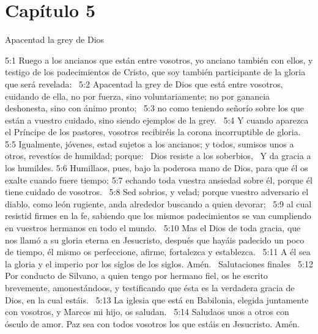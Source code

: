 \section*{Capítulo 5}
Apacentad la grey de Dios  

5:1 Ruego a los ancianos que están entre vosotros, yo anciano también con ellos, y testigo de los padecimientos de Cristo, que soy también participante de la gloria que será revelada:  
5:2 Apacentad la grey de Dios que está entre vosotros, cuidando de ella, no por fuerza, sino voluntariamente; no por ganancia deshonesta, sino con ánimo pronto;  
5:3 no como teniendo señorío sobre los que están a vuestro cuidado, sino siendo ejemplos de la grey.  
5:4 Y cuando aparezca el Príncipe de los pastores, vosotros recibiréis la corona incorruptible de gloria.  
5:5 Igualmente, jóvenes, estad sujetos a los ancianos; y todos, sumisos unos a otros, revestíos de humildad; porque:  
Dios resiste a los soberbios,  
Y da gracia a los humildes. 
5:6 Humillaos, pues, bajo la poderosa mano de Dios, para que él os exalte cuando fuere tiempo; 
5:7 echando toda vuestra ansiedad sobre él, porque él tiene cuidado de vosotros.  
5:8 Sed sobrios, y velad; porque vuestro adversario el diablo, como león rugiente, anda alrededor buscando a quien devorar;  
5:9 al cual resistid firmes en la fe, sabiendo que los mismos padecimientos se van cumpliendo en vuestros hermanos en todo el mundo.  
5:10 Mas el Dios de toda gracia, que nos llamó a su gloria eterna en Jesucristo, después que hayáis padecido un poco de tiempo, él mismo os perfeccione, afirme, fortalezca y establezca.  
5:11 A él sea la gloria y el imperio por los siglos de los siglos. Amén.  
Salutaciones finales  
5:12 Por conducto de Silvano, a quien tengo por hermano fiel, os he escrito brevemente, amonestándoos, y testificando que ésta es la verdadera gracia de Dios, en la cual estáis.  
5:13 La iglesia que está en Babilonia, elegida juntamente con vosotros, y Marcos mi hijo, os saludan.  
5:14 Saludaos unos a otros con ósculo de amor. Paz sea con todos vosotros los que estáis en Jesucristo. Amén.